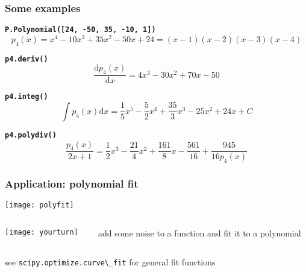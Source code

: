 \begin{frame}[fragile]\frametitle{Some examples}
 \begin{small}
  \textbf{\lstinline{P.Polynomial([24, -50, 35, -10, 1])}}
  \begin{displaymath}
   p_4(x) = x^4-10x^3+35x^2-50x+24 = (x-1)(x-2)(x-3)(x-4)
  \end{displaymath}

  \textbf{\lstinline{p4.deriv()}}
  \begin{displaymath}
   \frac{\text{d}p_4(x)}{\text{d}x} = 4x^3-30x^2+70x-50
  \end{displaymath}

  \textbf{\lstinline{p4.integ()}}
  \begin{displaymath}
   \int p_4(x)\text{d}x = \frac{1}{5}x^5-\frac{5}{2}x^4+\frac{35}{3}x^3
                          -25x^2+24x+C
  \end{displaymath}

  \textbf{\lstinline{p4.polydiv()}}
  \begin{displaymath}
   \frac{p_4(x)}{2x+1} = \frac{1}{2}x^3-\frac{21}{4}x^2+\frac{161}{8}x-\frac{561}{16}
   +\frac{945}{16p_4(x)}
  \end{displaymath}
 \end{small}
\end{frame}

\begin{frame}[fragile]\frametitle{Application: polynomial fit}
 \begin{center}
  \texttt{[image: polyfit]}
 \end{center}

 \vspace{-0.5truecm}
 \begin{columns}
  \begin{column}{0.4\linewidth}
   \begin{center}
    \texttt{[image: yourturn]}
   \end{center}
  \end{column}%
  \begin{column}{0.6\linewidth}
   add some noise to a function and fit it to a polynomial
  \end{column}%
 \end{columns}

 \vspace{0.3truecm}
 \small{see \lstinline{scipy.optimize.curve\_fit} for general fit functions}
\end{frame}

